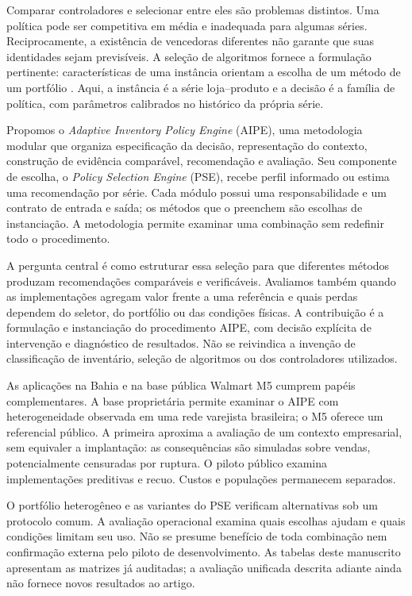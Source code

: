 \documentclass[preprint,12pt]{elsarticle}
\begin{document}
Comparar controladores e selecionar entre eles são problemas distintos. Uma política pode ser competitiva em média e inadequada para algumas séries. Reciprocamente, a existência de vencedoras diferentes não garante que suas identidades sejam previsíveis. A seleção de algoritmos fornece a formulação pertinente: características de uma instância orientam a escolha de um método de um portfólio \cite{rice1976,Kotthoff2014AlgorithmSelection}. Aqui, a instância é a série loja--produto e a decisão é a família de política, com parâmetros calibrados no histórico da própria série.

Propomos o \textit{Adaptive Inventory Policy Engine} (AIPE), uma metodologia modular que organiza especificação da decisão, representação do contexto, construção de evidência comparável, recomendação e avaliação. Seu componente de escolha, o \textit{Policy Selection Engine} (PSE), recebe perfil informado ou estima uma recomendação por série. Cada módulo possui uma responsabilidade e um contrato de entrada e saída; os métodos que o preenchem são escolhas de instanciação. A metodologia permite examinar uma combinação sem redefinir todo o procedimento.

A pergunta central é como estruturar essa seleção para que diferentes métodos produzam recomendações comparáveis e verificáveis. Avaliamos também quando as implementações agregam valor frente a uma referência e quais perdas dependem do seletor, do portfólio ou das condições físicas. A contribuição é a formulação e instanciação do procedimento AIPE, com decisão explícita de intervenção e diagnóstico de resultados. Não se reivindica a invenção de classificação de inventário, seleção de algoritmos ou dos controladores utilizados.

As aplicações na Bahia e na base pública Walmart M5 cumprem papéis complementares. A base proprietária permite examinar o AIPE com heterogeneidade observada em uma rede varejista brasileira; o M5 oferece um referencial público. A primeira aproxima a avaliação de um contexto empresarial, sem equivaler a implantação: as consequências são simuladas sobre vendas, potencialmente censuradas por ruptura. O piloto público examina implementações preditivas e recuo. Custos e populações permanecem separados.

O portfólio heterogêneo e as variantes do PSE verificam alternativas sob um protocolo comum. A avaliação operacional examina quais escolhas ajudam e quais condições limitam seu uso. Não se presume benefício de toda combinação nem confirmação externa pelo piloto de desenvolvimento. As tabelas deste manuscrito apresentam as matrizes já auditadas; a avaliação unificada descrita adiante ainda não fornece novos resultados ao artigo.
\end{document}
